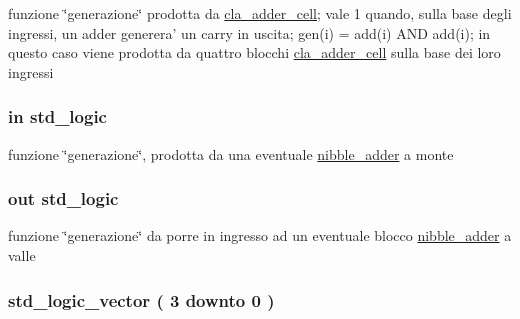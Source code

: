 funzione \char`\"{}generazione\char`\"{} prodotta da \hyperlink{classcla__adder__cell}{cla\+\_\+adder\+\_\+cell}; vale 1 quando, sulla base degli ingressi, un adder generera' un carry in uscita; gen(i) = add(i) A\+N\+D add(i); in questo caso viene prodotta da quattro blocchi \hyperlink{classcla__adder__cell}{cla\+\_\+adder\+\_\+cell} sulla base dei loro ingressi 

\hypertarget{group___nibble_adder_ga0a46d5193cb73eb993bc5d4f69741d0a}{
\subsubsection[{genin}]{ {\bfseries \textcolor{vhdlchar}{in}\textcolor{vhdlchar}{ }} {\bfseries \textcolor{vhdlchar}{std\+\_\+logic}\textcolor{vhdlchar}{ }} \hspace{0.3cm}{\ttfamily [Port]}}}\label{group___nibble_adder_ga0a46d5193cb73eb993bc5d4f69741d0a}


funzione \char`\"{}generazione\char`\"{}, prodotta da una eventuale \hyperlink{classnibble__adder}{nibble\+\_\+adder} a monte 

\hypertarget{group___nibble_adder_ga068cd5c4d23e284cb942702252ed1491}{
\subsubsection[{genout}]{ {\bfseries \textcolor{vhdlchar}{out}\textcolor{vhdlchar}{ }} {\bfseries \textcolor{vhdlchar}{std\+\_\+logic}\textcolor{vhdlchar}{ }} \hspace{0.3cm}{\ttfamily [Port]}}}\label{group___nibble_adder_ga068cd5c4d23e284cb942702252ed1491}


funzione \char`\"{}generazione\char`\"{} da porre in ingresso ad un eventuale blocco \hyperlink{classnibble__adder}{nibble\+\_\+adder} a valle 

\hypertarget{group___nibble_adder_ga3abd8d433ff039baabc0c6fc2126578b}{
\subsubsection[{prop}]{ {\bfseries \textcolor{vhdlchar}{std\+\_\+logic\+\_\+vector}\textcolor{vhdlchar}{ }\textcolor{vhdlchar}{(}\textcolor{vhdlchar}{ }\textcolor{vhdlchar}{ } \textcolor{vhdldigit}{3} \textcolor{vhdlchar}{ }\textcolor{vhdlchar}{downto}\textcolor{vhdlchar}{ }\textcolor{vhdlchar}{ } \textcolor{vhdldigit}{0} \textcolor{vhdlchar}{ }\textcolor{vhdlchar}{)}\textcolor{vhdlchar}{ }} \hspace{0.3cm}{\ttfamily [Signal]}}}\label{group___nibble_adder_ga3abd8d433ff039baabc0c6fc2126578b}


